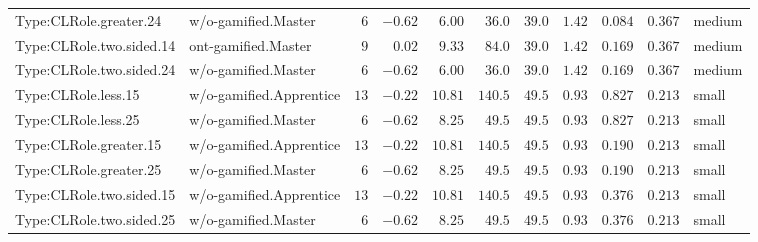 \documentclass[6pt,a4paper]{article}
\begin{document}
{\begin{longtable}{llrrrrrrrrl}
Type:CLRole.greater.24&w/o-gamified.Master&$ 6$&$-0.62$&$ 6.00$&$ 36.0$&$ 39.0$&$1.42$&$0.084$&$0.367$&medium\tabularnewline
Type:CLRole.two.sided.14&ont-gamified.Master&$ 9$&$ 0.02$&$ 9.33$&$ 84.0$&$ 39.0$&$1.42$&$0.169$&$0.367$&medium\tabularnewline
Type:CLRole.two.sided.24&w/o-gamified.Master&$ 6$&$-0.62$&$ 6.00$&$ 36.0$&$ 39.0$&$1.42$&$0.169$&$0.367$&medium\tabularnewline
Type:CLRole.less.15&w/o-gamified.Apprentice&$13$&$-0.22$&$10.81$&$140.5$&$ 49.5$&$0.93$&$0.827$&$0.213$&small\tabularnewline
Type:CLRole.less.25&w/o-gamified.Master&$ 6$&$-0.62$&$ 8.25$&$ 49.5$&$ 49.5$&$0.93$&$0.827$&$0.213$&small\tabularnewline
Type:CLRole.greater.15&w/o-gamified.Apprentice&$13$&$-0.22$&$10.81$&$140.5$&$ 49.5$&$0.93$&$0.190$&$0.213$&small\tabularnewline
Type:CLRole.greater.25&w/o-gamified.Master&$ 6$&$-0.62$&$ 8.25$&$ 49.5$&$ 49.5$&$0.93$&$0.190$&$0.213$&small\tabularnewline
\newpage
Type:CLRole.two.sided.15&w/o-gamified.Apprentice&$13$&$-0.22$&$10.81$&$140.5$&$ 49.5$&$0.93$&$0.376$&$0.213$&small\tabularnewline
Type:CLRole.two.sided.25&w/o-gamified.Master&$ 6$&$-0.62$&$ 8.25$&$ 49.5$&$ 49.5$&$0.93$&$0.376$&$0.213$&small\tabularnewline
\hline
\end{longtable}}
\end{document}
